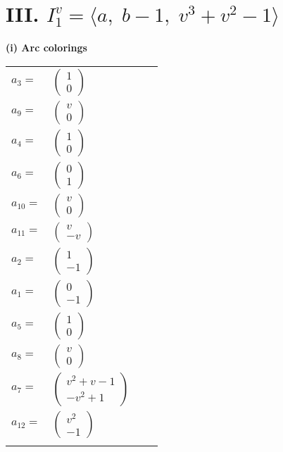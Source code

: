 \documentclass[1p]{elsarticle_modified}
\theoremstyle{definition}
\begin{document}
\centering \section*{III. $I^v_{1}= \langle a,\;b-1,\;v^3+v^2-1 \rangle$}
\flushleft \textbf{(i) Arc colorings}\\
\begin{tabular}{m{7pt} m{180pt} m{7pt} m{180pt} }
\flushright $a_{3}=$&$\begin{pmatrix}1\\0\end{pmatrix}$ \\
\flushright $a_{9}=$&$\begin{pmatrix}v\\0\end{pmatrix}$ \\
\flushright $a_{4}=$&$\begin{pmatrix}1\\0\end{pmatrix}$ \\
\flushright $a_{6}=$&$\begin{pmatrix}0\\1\end{pmatrix}$ \\
\flushright $a_{10}=$&$\begin{pmatrix}v\\0\end{pmatrix}$ \\
\flushright $a_{11}=$&$\begin{pmatrix}v\\- v\end{pmatrix}$ \\
\flushright $a_{2}=$&$\begin{pmatrix}1\\-1\end{pmatrix}$ \\
\flushright $a_{1}=$&$\begin{pmatrix}0\\-1\end{pmatrix}$ \\
\flushright $a_{5}=$&$\begin{pmatrix}1\\0\end{pmatrix}$ \\
\flushright $a_{8}=$&$\begin{pmatrix}v\\0\end{pmatrix}$ \\
\flushright $a_{7}=$&$\begin{pmatrix}v^2+v-1\\- v^2+1\end{pmatrix}$ \\
\flushright $a_{12}=$&$\begin{pmatrix}v^2\\-1\end{pmatrix}$\\&\end{tabular}
\end{document}
